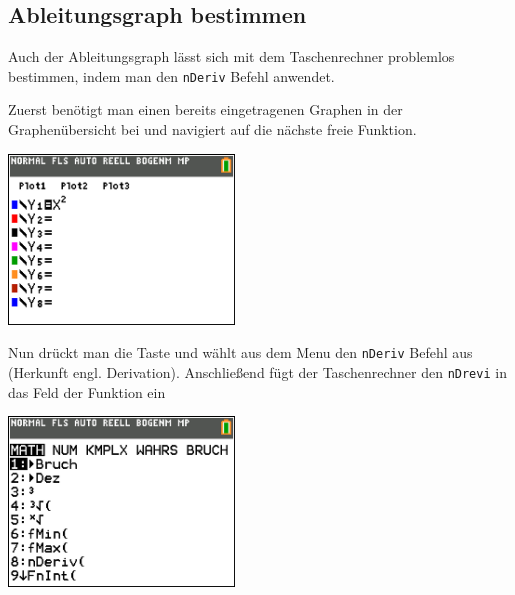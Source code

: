 \subsection{Ableitungsgraph bestimmen}
Auch der Ableitungsgraph lässt sich mit dem Taschenrechner problemlos bestimmen, indem man den \texttt{nDeriv} Befehl anwendet. 
\begin{paracol}{2}
\begin{flushleft}
	Zuerst benötigt man einen bereits eingetragenen Graphen in der Graphenübersicht bei  und navigiert auf die nächste freie Funktion.
\end{flushleft}
\switchcolumn
\begin{flushright}
\includegraphics[width=6cm]{Media/GRT/Visualisierung/ableitung_bestimmen/ableitung_bestimmen_1.png}
\end{flushright}
\end{paracol}

\begin{paracol}{2}
\begin{flushleft}
	Nun drückt man die Taste  und wählt aus dem Menu den \texttt{nDeriv} Befehl aus (Herkunft engl. Derivation). Anschließend fügt der Taschenrechner den \texttt{nDrevi} in das Feld der Funktion ein
\end{flushleft}	
\switchcolumn
\begin{flushright}
\includegraphics[width=6cm]{Media/GRT/Visualisierung/ableitung_bestimmen/ableitung_bestimmen_2.png}
\end{flushright}
\end{paracol}

